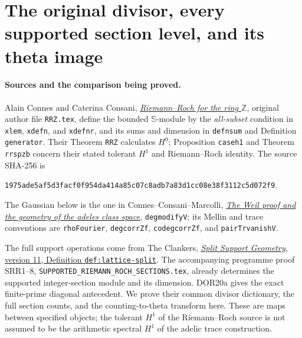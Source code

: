 \section{The original divisor, every supported section level, and its theta image}
\label{sec:rr-theta-degree}

\paragraph{Sources and the comparison being proved.}
Alain Connes and Caterina Consani, \href{https://arxiv.org/abs/2306.00456v1}
{\emph{Riemann--Roch for the ring $\mathbb Z$}}, original author file
\nolinkurl{RRZ.tex}, define the bounded $\mathbb S$-module by the
\emph{all-subset} condition in \texttt{xlem}, \texttt{xdefn}, and
\texttt{xdefnr}, and its sums and dimension in \texttt{defnsum} and
Definition \texttt{generator}. Their Theorem \texttt{RRZ} calculates
$H^0$; Proposition \texttt{caseh1} and Theorem \texttt{rrspzb} concern
their stated tolerant $H^1$ and Riemann--Roch identity. The source SHA-256 is
\par\noindent
\nolinkurl{1975ade5af5d3facf0f954da414a85c07c8adb7a83d1cc08e38f3112c5d072f9}.
\par
The Gaussian below is the one in Connes--Consani--Marcolli,
\href{https://arxiv.org/abs/math/0703392v1}{\emph{The Weil proof and the
geometry of the adeles class space}}, \texttt{degmodifyV}; its Mellin
and trace conventions are \texttt{rhoFourier}, \texttt{degcorrZf},
\texttt{codegcorrZf}, and \texttt{pairTrvanishV}.

The full support operations come from The Clankers,
\href{https://github.com/KokunoYumeto/zeta-function-research-reader/blob/a2851f9eb352e7e4376bc629de86fa4ed9c1c434/workbenches/splitzero-tandem/foundations/split-support-geometry-v11/split_support_geometry_arithmetic_curve_v11.tex#L1226}
{\emph{Split Support Geometry}, version 11, Definition
\texttt{def:lattice-split}}. The accompanying programme proof SRR1--8,
\nolinkurl{SUPPORTED_RIEMANN_ROCH_SECTIONS.tex}, already determines
the supported integer-section module and its dimension. DOR20a gives
the exact finite-prime diagonal antecedent. We prove their common
divisor dictionary, the full section counts, and the counting-to-theta
transform here. These are maps between specified objects; the tolerant
$H^1$ of the Riemann--Roch source is not assumed to be the arithmetic
spectral $H^1$ of the adelic trace construction.

